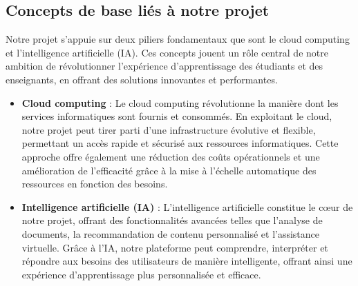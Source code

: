 \vspace{0.5em}

\vspace{0.5em}

\subsection{Concepts de base liés à notre projet} 
Notre projet s'appuie sur deux piliers fondamentaux que sont le cloud computing et l'intelligence artificielle (IA). Ces concepts jouent un rôle central de notre ambition de révolutionner l'expérience d'apprentissage des étudiants et des enseignants, en offrant des solutions innovantes et performantes. 

\begin{itemize}[itemsep=2pt, parsep=2pt]
    \item \textbf{Cloud computing} : Le cloud computing révolutionne la manière dont les services informatiques sont fournis et consommés. En exploitant le cloud, notre projet peut tirer parti d'une infrastructure évolutive et flexible, permettant un accès rapide et sécurisé aux ressources informatiques. Cette approche offre également une réduction des coûts opérationnels et une amélioration de l'efficacité grâce à la mise à l'échelle automatique des ressources en fonction des besoins.
    \item \textbf{Intelligence artificielle (IA)} : L'intelligence artificielle constitue le cœur de notre projet, offrant des fonctionnalités avancées telles que l'analyse de documents, la recommandation de contenu personnalisé et l'assistance virtuelle. Grâce à l'IA, notre plateforme peut comprendre, interpréter et répondre aux besoins des utilisateurs de manière intelligente, offrant ainsi une expérience d'apprentissage plus personnalisée et efficace. 
\end{itemize}

